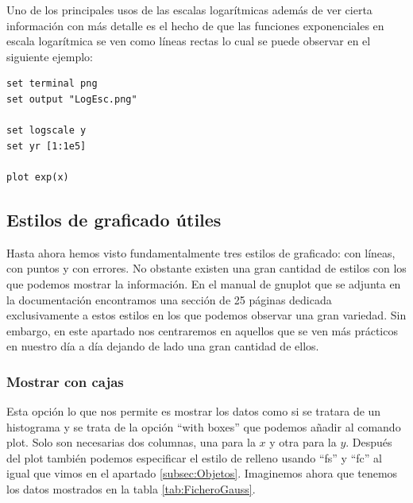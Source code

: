 \documentclass[11pt,a4paper,twoside,pdf]{article}
\numberwithin{equation}{section}
\begin{document}
Uno de los principales usos de las escalas logarítmicas además de ver cierta información con más detalle es el hecho de que las funciones exponenciales en escala logarítmica se ven como líneas rectas lo cual se puede observar en el siguiente ejemplo:

\begin{lstlisting}[language=Gnuplot]
set terminal png
set output "LogEsc.png"

set logscale y
set yr [1:1e5]

plot exp(x)
\end{lstlisting}

\subsection{Estilos de graficado útiles}

Hasta ahora hemos visto fundamentalmente tres estilos de graficado: con líneas, con puntos y con errores. No obstante existen una gran cantidad de estilos con los que podemos mostrar la información. En el manual de gnuplot que se adjunta en la documentación \cite{gnuplot-5.4-doc} encontramos una sección de 25 páginas dedicada exclusivamente a estos estilos en los que podemos observar una gran variedad. Sin embargo, en este apartado nos centraremos en aquellos que se ven más prácticos en nuestro día a día dejando de lado una gran cantidad de ellos.

\subsubsection{Mostrar con cajas}

Esta opción lo que nos permite es mostrar los datos como si se tratara de un histograma y se trata de la opción ``with boxes'' que podemos añadir al comando plot. Solo son necesarias dos columnas, una para la $x$ y otra para la $y$. Después del plot también podemos especificar el estilo de relleno usando ``fs'' y ``fc'' al igual que vimos en el apartado \ref{subsec:Objetos}. Imaginemos ahora que tenemos los datos mostrados en la tabla \ref{tab:FicheroGauss}. \\
\end{document}
